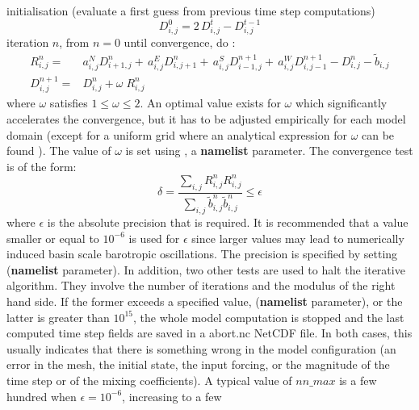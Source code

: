 \documentclass[NEMO_book]{subfiles}
\begin{document}
initialisation (evaluate a first guess from previous time step computations)
\begin{equation}
D_{i,j}^0 = 2 \, D_{i,j}^t - D_{i,j}^{t-1}
\end{equation}
iteration $n$, from $n=0$ until convergence, do :
\begin{equation} \label{Eq_sor_algo}
\begin{split}
R_{i,j}^n  = &a_{i,j}^{N} D_{i+1,j}^n       +\,a_{i,j}^{E}  D_{i,j+1} ^n	    	
			+\, a_{i,j}^{S}  D_{i-1,j} ^{n+1}+\,a_{i,j}^{W} D_{i,j-1} ^{n+1}
                 -  D_{i,j}^n - \tilde{b}_{i,j}                                           \\
D_{i,j} ^{n+1}  = &D_{i,j} ^{n}   + \omega \;R_{i,j}^n     
\end{split}
\end{equation}
where \textit{$\omega $ }satisfies $1\leq \omega \leq 2$. An optimal value exists for 
\textit{$\omega$} which significantly accelerates the convergence, but it has to be 
adjusted empirically for each model domain (except for a uniform grid where an 
analytical expression for \textit{$\omega$} can be found \citep{Richtmyer1967}). 
The value of $\omega$ is set using , a \textbf{namelist} parameter. 
The convergence test is of the form:
\begin{equation}
\delta = \frac{\sum\limits_{i,j}{R_{i,j}^n}{R_{i,j}^n}}
                    {\sum\limits_{i,j}{ \tilde{b}_{i,j}^n}{\tilde{b}_{i,j}^n}} \leq \epsilon
\end{equation}
where $\epsilon$ is the absolute precision that is required. It is recommended 
that a value smaller or equal to $10^{-6}$ is used for $\epsilon$ since larger 
values may lead to numerically induced basin scale barotropic oscillations. 
The precision is specified by setting  (\textbf{namelist} parameter). 
In addition, two other tests are used to halt the iterative algorithm. They involve 
the number of iterations and the modulus of the right hand side. If the former 
exceeds a specified value,  (\textbf{namelist} parameter), 
or the latter is greater than $10^{15}$, the whole model computation is stopped 
and the last computed time step fields are saved in a abort.nc NetCDF file. 
In both cases, this usually indicates that there is something wrong in the model 
configuration (an error in the mesh, the initial state, the input forcing, 
or the magnitude of the time step or of the mixing coefficients). A typical value of 
$nn\_max$ is a few hundred when $\epsilon = 10^{-6}$, increasing to a few 
\end{document}
